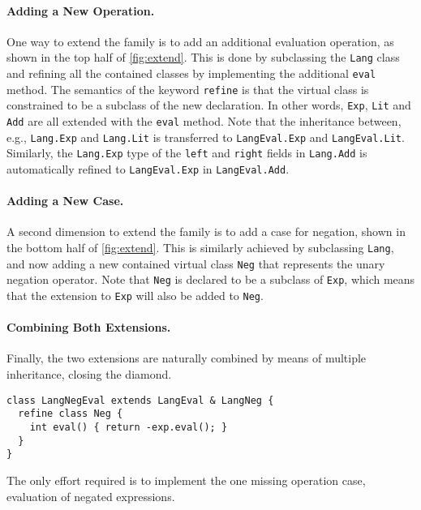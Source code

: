 \paragraph{Adding a New Operation.}

One way to extend the family is to add an additional evaluation operation, as
shown in the top half of \cref{fig:extend}. This is done by subclassing the
\lstinline{Lang} class and refining all the contained classes by implementing
the additional \lstinline{eval} method. The semantics of the keyword
\lstinline[language=gbeta]{refine} is that the virtual class is constrained to
be a subclass of the new declaration. In other words, \lstinline{Exp},
\lstinline{Lit} and \lstinline{Add} are all extended with the \lstinline{eval}
method. Note that the inheritance between, e.g., \lstinline{Lang.Exp} and
\lstinline{Lang.Lit} is transferred to \lstinline{LangEval.Exp} and
\lstinline{LangEval.Lit}. Similarly, the \lstinline{Lang.Exp} type of the
\lstinline{left} and \lstinline{right} fields in \lstinline{Lang.Add} is
automatically refined to \lstinline{LangEval.Exp} in \lstinline{LangEval.Add}.

\paragraph{Adding a New Case.}

A second dimension to extend the family is to add a case for negation, shown in
the bottom half of \cref{fig:extend}. This is similarly achieved by subclassing
\lstinline{Lang}, and now adding a new contained virtual class \lstinline{Neg}
that represents the unary negation operator. Note that \lstinline{Neg} is
declared to be a subclass of \lstinline{Exp}, which means that the extension to
\lstinline{Exp} will also be added to \lstinline{Neg}.


\paragraph{Combining Both Extensions.}

Finally, the two extensions are naturally combined by means of
multiple inheritance, closing the diamond.
\begin{lstlisting}[language=gbeta]
class LangNegEval extends LangEval & LangNeg {
  refine class Neg {
    int eval() { return -exp.eval(); }
  }
}
\end{lstlisting}
The only effort required is to implement the one missing operation
case, evaluation of negated expressions.

